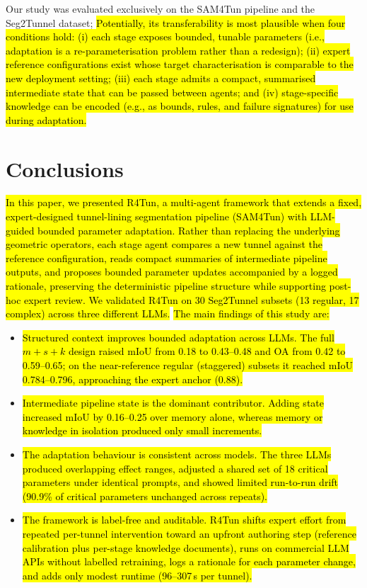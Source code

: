 \documentclass[a4paper,fleqn]{cas-dc}
\begin{document}
{Our study was evaluated exclusively on the SAM4Tun pipeline and the Seg2Tunnel dataset; \hl{Potentially, its transferability is most plausible when four conditions hold: (i) each stage exposes bounded, tunable parameters (i.e., adaptation is a re-parameterisation problem rather than a redesign); (ii) expert reference configurations exist whose target characterisation is comparable to the new deployment setting; (iii) each stage admits a compact, summarised intermediate state that can be passed between agents; and (iv) stage-specific knowledge can be encoded (e.g., as bounds, rules, and failure signatures) for use during adaptation.} 

\section{Conclusions}\label{sec:conclusions}

\hl{In this paper, we presented R4Tun, a multi-agent framework that extends a fixed, expert-designed tunnel-lining segmentation pipeline (SAM4Tun) with LLM-guided bounded parameter adaptation. Rather than replacing the underlying geometric operators, each stage agent compares a new tunnel against the reference configuration, reads compact summaries of intermediate pipeline outputs, and proposes bounded parameter updates accompanied by a logged rationale, preserving the deterministic pipeline structure while supporting post-hoc expert review. We validated R4Tun on 30 Seg2Tunnel subsets (13 regular, 17 complex) across three different LLMs.} \hl{The main findings of this study are:}

\begin{itemize}
\item \hl{Structured context improves bounded adaptation across LLMs. The full \mbox{$m+s+k$} design raised mIoU from 0.18 to 0.43--0.48 and OA from 0.42 to 0.59--0.65; on the near-reference regular (staggered) subsets it reached mIoU 0.784--0.796, approaching the expert anchor (0.88).}
\item \hl{Intermediate pipeline state is the dominant contributor. Adding state increased mIoU by 0.16--0.25 over memory alone, whereas memory or knowledge in isolation produced only small increments.}
\item \hl{The adaptation behaviour is consistent across models. The three LLMs produced overlapping effect ranges, adjusted a shared set of 18 critical parameters under identical prompts, and showed limited run-to-run drift (90.9\% of critical parameters unchanged across repeats).}
\item \hl{The framework is label-free and auditable. R4Tun shifts expert effort from repeated per-tunnel intervention toward an upfront authoring step (reference calibration plus per-stage knowledge documents), runs on commercial LLM APIs without labelled retraining, logs a rationale for each parameter change, and adds only modest runtime (96--307\,s per tunnel).}
\end{itemize}

}
\end{document}
